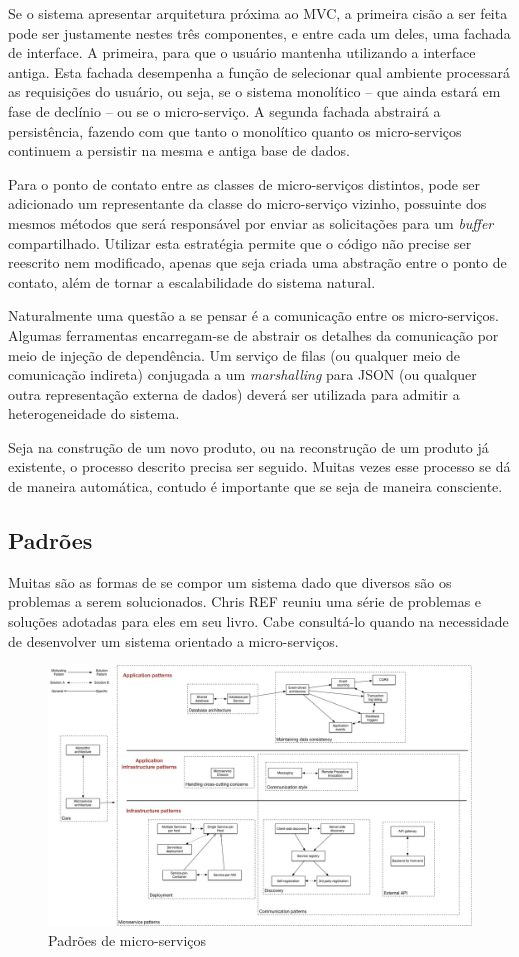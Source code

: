 Se o sistema apresentar arquitetura próxima ao MVC, a primeira cisão a ser feita pode ser justamente nestes três componentes, e entre cada um deles, uma fachada de interface. A primeira, para que o usuário mantenha utilizando a interface antiga. Esta fachada desempenha a função de selecionar qual ambiente processará as requisições do usuário, ou seja, se o sistema monolítico -- que ainda estará em fase de declínio -- ou se o micro-serviço. A segunda fachada abstrairá a persistência, fazendo com que tanto o monolítico quanto os micro-serviços continuem a persistir na mesma e antiga base de dados.

Para o ponto de contato entre as classes de micro-serviços distintos, pode ser adicionado um representante da classe do micro-serviço vizinho, possuinte dos mesmos métodos que será responsável por enviar as solicitações para um \textit{buffer} compartilhado. Utilizar esta estratégia permite que o código não precise ser reescrito nem modificado, apenas que seja criada uma abstração entre o ponto de contato, além de tornar a escalabilidade do sistema natural.

Naturalmente uma questão a se pensar é a comunicação entre os micro-serviços. Algumas ferramentas encarregam-se de abstrair os detalhes da comunicação por meio de injeção de dependência. Um serviço de filas (ou qualquer meio de comunicação indireta) conjugada a um \textit{marshalling} para JSON (ou qualquer outra representação externa de dados) deverá ser utilizada para admitir a heterogeneidade do sistema.

Seja na construção de um novo produto, ou na reconstrução de um produto já existente, o processo descrito precisa ser seguido. Muitas vezes esse processo se dá de maneira automática, contudo é importante que se seja de maneira consciente.

\subsection{Padrões}

Muitas são as formas de se compor um sistema dado que diversos são os problemas a serem solucionados. Chris REF reuniu uma série de problemas e soluções adotadas para eles em seu livro. Cabe consultá-lo quando na necessidade de desenvolver um sistema orientado a micro-serviços.

\begin{figure}
\centering
\includegraphics[width=14cm]{MicroservicesPatternLanguage}
\caption{Padrões de micro-serviços}
\end{figure}